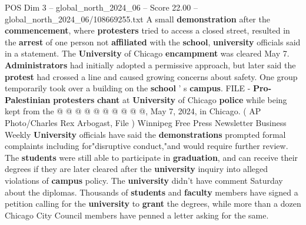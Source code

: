 \begin{textsample}{POS Dim 3 – global\_north\_2024\_06 – Score 22.00 – global\_north\_2024\_06/108669255.txt}
A small \textbf{demonstration} after the \textbf{commencement}, where \textbf{protesters} tried to access a closed street, resulted in the \textbf{arrest} of one person not \textbf{affiliated} with the \textbf{school}, \textbf{university} officials said in a statement.
The \textbf{University} of Chicago \textbf{encampment} was cleared May 7. \textbf{Administrators} had initially adopted a permissive approach, but later said the \textbf{protest} had crossed a line and caused growing concerns about safety.
One group temporarily took over a building on the \textbf{school} ' s \textbf{campus}.
FILE - \textbf{Pro-Palestinian} \textbf{protesters} \textbf{chant} at \textbf{University} of Chicago \textbf{police} while being kept from the @ @ @ @ @ @ @ @ @ @, May 7, 2024, in Chicago. ( AP Photo/Charles Rex Arbogast, File ) Winnipeg Free Press Newsletter Business Weekly \textbf{University} officials have said the \textbf{demonstrations} prompted formal complaints including for"disruptive conduct,"and would require further review.
The \textbf{students} were still able to participate in \textbf{graduation}, and can receive their degrees if they are later cleared after the \textbf{university} inquiry into alleged violations of \textbf{campus} policy.
The \textbf{university} didn't have comment Saturday about the diplomas.
Thousands of \textbf{students} and \textbf{faculty} members have signed a petition calling for the \textbf{university} to \textbf{grant} the degrees, while more than a dozen Chicago City Council members have penned a letter asking for the same.

\end{textsample}

